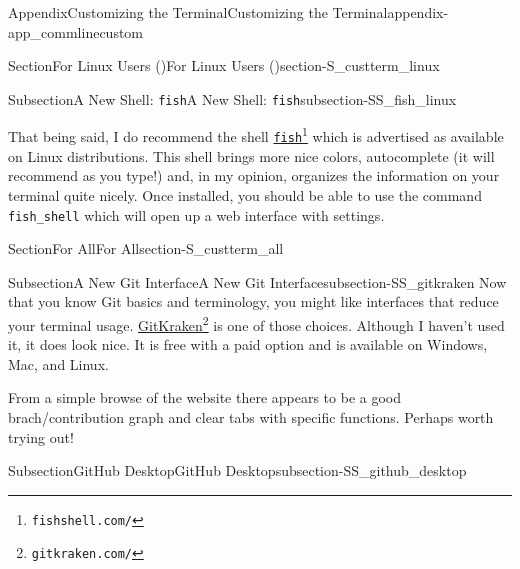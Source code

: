 \documentclass[oneside,10pt,]{book}
\newcommand{\mono}[1]{\texttt{#1}}
\begin{document}
\begin{appendixptx}{Appendix}{Customizing the Terminal}{}{Customizing the Terminal}{}{}{appendix-app_commlinecustom}
\begin{sectionptx}{Section}{For Linux Users (\textasteriskcentered{})}{}{For Linux Users (\textasteriskcentered{})}{}{}{section-S_custterm_linux}
\begin{subsectionptx}{Subsection}{A New Shell: \mono{fish}}{}{A New Shell: \mono{fish}}{}{}{subsection-SS_fish_linux}
\par
That being said, I do recommend the shell \href{https://fishshell.com/}{\mono{fish}}\footnote{\nolinkurl{fishshell.com/}\label{fn-SS_fish_linux-e-b}} which is advertised as available on Linux distributions. This shell brings more nice colors, autocomplete (it will recommend as you type!) and, in my opinion, organizes the information on your terminal quite nicely. Once installed, you should be able to use the command \mono{fish\_shell} which will open up a web interface with settings.%
\end{subsectionptx}
\end{sectionptx}
%
%
\typeout{************************************************}
\typeout{************************************************}
%
\begin{sectionptx}{Section}{For All}{}{For All}{}{}{section-S_custterm_all}
%
%
\typeout{************************************************}
\typeout{************************************************}
%
\begin{subsectionptx}{Subsection}{A New Git Interface}{}{A New Git Interface}{}{}{subsection-SS_gitkraken}
%
%
Now that you know Git basics and terminology, you might like interfaces that reduce your terminal usage. \href{https://www.gitkraken.com/}{GitKraken}\footnote{\nolinkurl{gitkraken.com/}\label{fn-SS_gitkraken-d-b}} is one of those choices. Although I haven't used it, it does look nice. It is free with a paid option and is available on Windows, Mac, and Linux.%
\par
From a simple browse of the website there appears to be a good brach\slash{}contribution graph and clear tabs with specific functions. Perhaps worth trying out!%
\end{subsectionptx}
%
%
\typeout{************************************************}
\typeout{************************************************}
%
\begin{subsectionptx}{Subsection}{GitHub Desktop}{}{GitHub Desktop}{}{}{subsection-SS_github_desktop}
%
%

\end{subsectionptx}
\end{sectionptx}
\end{appendixptx}
\end{document}

